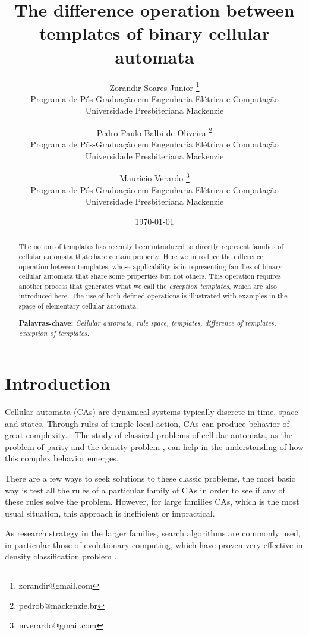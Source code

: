 \documentclass[12pt, a4paper]{article}
\title{The difference operation between templates of binary cellular automata}
\author{Zorandir Soares Junior \footnote{zorandir@gmail.com} \\
 	Programa de Pós-Graduação em Engenharia Elétrica e Computação \\
	Universidade Presbiteriana Mackenzie
	\and
	Pedro Paulo Balbi de Oliveira \footnote{pedrob@mackenzie.br}  \\
 	Programa de Pós-Graduação em Engenharia Elétrica e Computação \\
	Universidade Presbiteriana Mackenzie
	\and
	Maurício Verardo \footnote{mverardo@gmail.com}  \\
 	Programa de Pós-Graduação em Engenharia Elétrica e Computação \\
	Universidade Presbiteriana Mackenzie
	}
\date{\today}
\begin{document}

\pagestyle{plain}
\renewcommand{\baselinestretch}{1.25} 
\normalsize

\maketitle

\begin{abstract}
 The notion of templates has recently been introduced to directly represent families of cellular automata that share certain property. Here we introduce the difference operation between templates, whose applicability is in representing families of binary cellular automata that share some properties but not others. This operation requires another process that generates what we call the \textit{exception templates}, which are also introduced here. The use of both defined operations is illustrated with examples in the space of elementary cellular automata. 

\begin{flushleft}
{\bf Palavras-chave:} {\it Cellular automata, rule space, templates, difference of templates, exception of templates.}
\end{flushleft}
\end{abstract}

\section{Introduction}
\label{sec:introducao}
Cellular automata (CAs) are dynamical systems typically discrete in time, space and states.
Through rules of simple local action, CAs can produce behavior of great complexity. \cite{wolfram2002}. The study of classical problems of cellular automata, as the problem of parity \cite{Betel2013} and the density problem \cite{deOliveira2014density}, can help in the understanding of how this complex behavior emerges. %

There are a few ways to seek solutions to these classic problems, the most basic way is test all the rules of a particular family of CAs in order to see if any of these rules solve the problem. However, for large families CAs, which is the most usual situation, this approach is inefficient or impractical.

As research strategy in the larger families, search algorithms are commonly used, in particular those of evolutionary computing, which have proven very effective in density classification problem \cite{wolz2008very}.%
\end{document}

